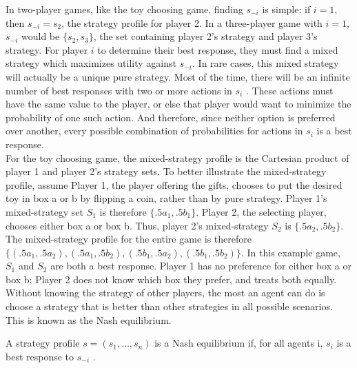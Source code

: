 In two-player games, like the toy choosing game, finding $s_{-i}$ is simple: if $i=1$, then $s_{-i}=s_2$, the strategy profile for player 2. In a three-player game with $i=1$, $s_{-i}$ would be $\{s_2, s_3\}$, the set containing player 2's strategy and player 3's strategy. For player $i$ to determine their best response, they must find a mixed strategy which maximizes utility against $s_{-i}$. In rare cases, this mixed strategy will actually be a unique pure strategy. Most of the time, there will be an infinite number of best responses with two or more actions in $s_i$ \cite{shoh09}. These actions must have the same value to the player, or else that player would want to minimize the probability of one such action. And therefore, since neither option is preferred over another, every possible combination of probabilities for actions in $s_i$ is a best response.\\

For the toy choosing game, the mixed-strategy profile is the Cartesian product of player 1 and player 2's strategy sets. To better illustrate the mixed-strategy profile, assume Player 1, the player offering the gifts, chooses to put the desired toy in box a or b by flipping a coin, rather than by pure strategy. Player 1's mixed-strategy set $S_1$ is therefore $\{.5a_1, .5b_1\}$. Player 2, the selecting player, chooses either box a or box b. Thus, player 2's mixed-strategy $S_2$ is $\{.5a_2, .5b_2\}$. The mixed-strategy profile for the entire game is therefore $\{(.5a_1, .5a_2), (.5a_1, .5b_2), (.5b_1, .5a_2), (.5b_1, .5b_2)\}$. In this example game, $S_1$ and $S_2$ are both a best response. Player 1 has no preference for either box a or box b; Player 2 does not know which box they prefer, and treats both equally.\\

Without knowing the strategy of other players, the most an agent can do is choose a strategy that is better than other strategies in all possible scenarios. This is known as the Nash equilibrium.

\begin{define}
  A strategy profile $s=(s_1,\dots ,s_n)$ is a Nash equilibrium if, for all agents i, $s_i$ is a best response to $s_{-i}$ \cite{shoh09}.
\end{define}

